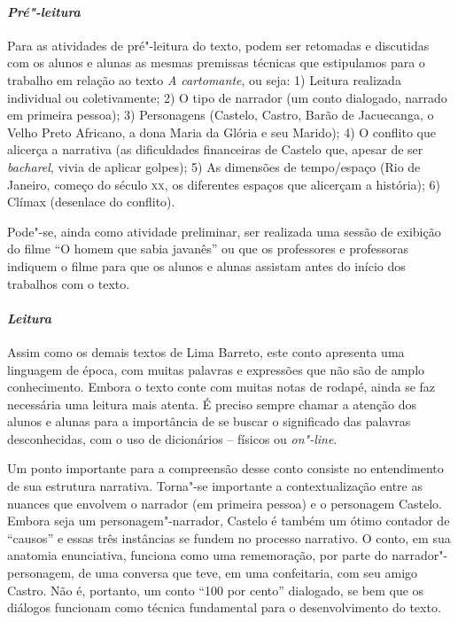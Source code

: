 \documentclass{extarticle}
\begin{document}
\paragraph{\textit{Pré"-leitura}}

Para as atividades de pré"-leitura do texto, podem ser retomadas e
discutidas com os alunos e alunas as mesmas premissas técnicas que
estipulamos para o trabalho em relação ao texto {\textit{A
cartomante}}, ou seja: 1) Leitura realizada individual ou coletivamente;
2) O tipo de narrador (um conto dialogado, narrado em primeira pessoa);
3) Personagens (Castelo, Castro, Barão de Jacuecanga, o Velho Preto
Africano, a dona Maria da Glória e seu Marido); 4) O conflito que
alicerça a narrativa (as dificuldades financeiras de Castelo que, apesar
de ser \emph{bacharel}, vivia de aplicar golpes); 5) As dimensões de
tempo/espaço (Rio de Janeiro, começo do século \textsc{xx}, os diferentes espaços
que alicerçam a história); 6) Clímax (desenlace do conflito).

Pode"-se, ainda como atividade preliminar, ser realizada uma sessão de
exibição do filme ``O homem que sabia javanês'' ou que os professores e
professoras indiquem o filme para que os alunos e alunas assistam antes
do início dos trabalhos com o texto.

\paragraph{\textit{Leitura}}

Assim como os demais textos de Lima Barreto, este conto apresenta uma
linguagem de época, com muitas palavras e expressões que não são de
amplo conhecimento. Embora o texto conte com muitas notas de rodapé,
ainda se faz necessária uma leitura mais atenta. É preciso sempre chamar
a atenção dos alunos e alunas para a importância de se buscar o
significado das palavras desconhecidas, com o uso de dicionários --
físicos ou ­\emph{on"-line}.

Um ponto importante para a compreensão desse conto consiste no
entendimento de sua estrutura narrativa. Torna"-se importante a
contextualização entre as nuances que envolvem o narrador (em primeira
pessoa) e o personagem Castelo. Embora seja um personagem"-narrador,
Castelo é também um ótimo contador de ``causos'' e essas três instâncias
se fundem no processo narrativo. O conto, em sua anatomia enunciativa,
funciona como uma rememoração, por parte do narrador"-personagem, de uma
conversa que teve, em uma confeitaria, com seu amigo Castro. Não é,
portanto, um conto ``100 por cento'' dialogado, se bem que os diálogos
funcionam como técnica fundamental para o desenvolvimento do texto.
\end{document}
